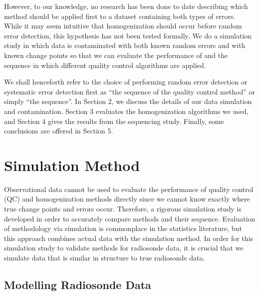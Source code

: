 \documentclass[12pt]{article}
\begin{document}
\begin{doublespacing}
However, to our knowledge, no research has been done to date describing which method should be applied first to a dataset containing both types of errors.  While it may seem intuitive that homogenization should occur before random error detection, this hypothesis has not been tested formally.  We do a simulation study in which data is contaminated with both known random errors and with known change points so that we can  evaluate the performance of and the sequence in which different quality control algorithms are applied.

We shall henceforth refer to the choice of performing random error detection or systematic error detection first  as ``the sequence of the quality control method'' or simply ``the sequence''.  In Section 2, we discuss the details of our data simulation and contamination.  Section 3 evaluates the homogenization algorithms we used, and Section 4 gives the results from the sequencing study.  Finally, some conclusions are offered in Section 5.

\section{Simulation Method}
Observational data cannot be used to evaluate the performance of quality control (QC) and homogenization methods directly since we cannot know exactly where true change points and errors occur.  Therefore, a rigorous simulation study is developed in order to accurately compare methods and their sequence.  Evaluation of methodology via simulation is commonplace in the statistics literature, but this approach combines actual data with the simulation method.  In order for this simulation study to validate methods for radiosonde data, it is crucial that we simulate data that is similar in structure to true radiosonde data.

\subsection{Modelling Radiosonde Data}
\label{ssec:model}


\end{doublespacing}
\end{document}
